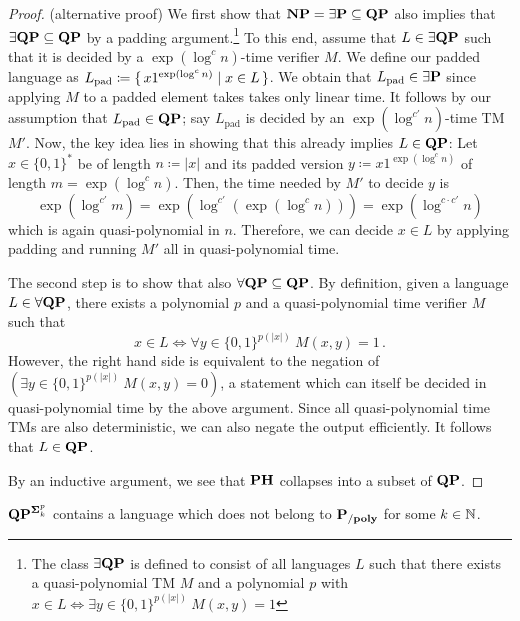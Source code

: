 \documentclass[12pt]{article}
\theoremstyle{definition}
\begin{document}
\bigskip
\begin{proof} (alternative proof)
  We first show that $\NP = \exists \P \subseteq \class{QP}$ also implies that
  $\exists \class{QP} \subseteq \class{QP}$ by a padding
  argument.\footnote{The class $\exists \class{QP}$ is defined to consist of
  all languages $L$ such that there exists a quasi-polynomial TM $M$ and a
  polynomial $p$ with $x \in L \iff \exists y \in \{0,1\}^{p(|x|)}\
  M(x,y) = 1$}
  To this end, assume that $L \in \exists \class{QP}$ such that it is decided
  by a $\exp(\log^c n)$-time verifier $M$.
  We define our padded language as
  $L_{\textrm{pad}} \coloneqq \set{ x 1^{\exp(\log^c n)} \mid x \in L }$.
  We obtain that $L_{\textrm{pad}} \in \exists \P$ since applying $M$ to a
  padded element takes takes only linear time.
  It follows by our assumption that $L_{\textrm{pad}} \in \class{QP}$;
  say $L_{\textrm{pad}}$ is decided by an $\exp(\log^{c'} n)$-time TM $M'$.
  Now, the key idea lies in showing that this already implies
  $L \in \class{QP}$:
  Let $x \in \{0,1\}^*$ be of length $n \coloneqq |x|$ and
  its padded version $y \coloneqq x 1^{\exp(\log^c n)}$ of length
  $m = \exp(\log^c n)$. Then, the time needed by $M'$ to decide $y$ is
  \[
    \exp(\log^{c'} m)
    =
    \exp(\log^{c'}(\exp(\log^c n)))
    =
    \exp(\log^{c \cdot c'} n)
  \]
  which is again quasi-polynomial in $n$.
  Therefore, we can decide $x \in L$ by applying padding and running $M'$ all
  in quasi-polynomial time.

  The second step is to show that also
  $\forall \class{QP} \subseteq \class{QP}$.
  By definition, given a language $L \in \forall \class{QP}$, there exists a
  polynomial $p$ and a quasi-polynomial time verifier $M$ such that
  \[
    x \in L \iff \forall y \in \{0,1\}^{p(|x|)}\ M(x,y) = 1 \,.
  \]
  However, the right hand side is equivalent to the negation of
  $(\exists y \in \{0,1\}^{p(|x|)}\ M(x,y) = 0)$, a statement which can itself
  be decided in quasi-polynomial time by the above argument.
  Since all quasi-polynomial time TMs are also deterministic, we can also
  negate the output efficiently. It follows that $L \in \class{QP}$.

  By an inductive argument, we see that $\class{PH}$ collapses into a subset of
  $\class{QP}$.
\end{proof}

\begin{lemma}
  \label{lem:qp-super-circ}
  $\class{QP}^{\class{\Sigma}^p_k}$ contains a language which does not belong
  to $\Ppoly$ for some $k \in \N$.
\end{lemma}
\end{document}
